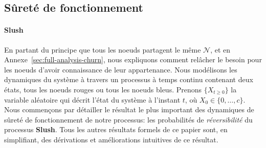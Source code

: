 \documentclass[letterpaper,twocolumn,10pt]{article}
\theoremstyle{definition}
\begin{document}



\subsection{Sûreté de fonctionnement}


\paragraph{Slush}
En partant du principe que tous les noeuds partagent le même $\mathcal{N}$, et en Annexe~\ref{sec:full-analysis-churn},
nous expliquons comment relâcher le besoin pour les noeuds d'avoir connaissance de leur appartenance. Nous modélisons
les dynamiques du système à travers un processus à temps continu contenant deux états, tous les noeuds rouges ou tous
les noeuds bleus. Prenons $\{X_{t \geq 0}\}$ la variable aléatoire qui décrit l'état du système à l'instant $t$, où
$X_0 \in \{0, \dots, c\}$.
Nous commençons par détailler le résultat le plus important des dynamiques de sûreté de fonctionnement de notre
processus: les probabilités de \emph{réversibilité} du processus \textbf{Slush}. Tous les autres résultats formels de
ce papier sont, en simplifiant, des dérivations et améliorations intuitives de ce résultat.
\end{document}
